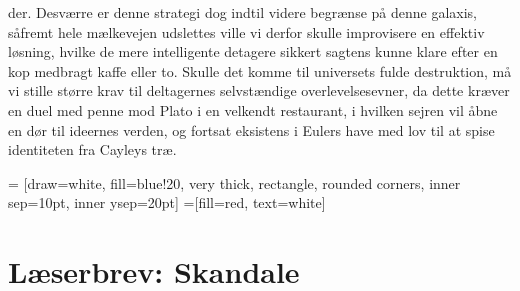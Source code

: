 \begin{minipage}[b]{0.95\linewidth}
\begin{minipage}[t]{0.47\textwidth}
der. Desværre er denne strategi dog indtil videre begrænse på denne galaxis, såfremt hele mælkevejen udslettes ville vi derfor skulle improvisere en effektiv løsning, hvilke de mere intelligente detagere sikkert sagtens kunne klare efter en kop medbragt kaffe eller to. Skulle det komme til universets fulde destruktion, må vi stille større krav til deltagernes selvstændige overlevelsesevner, da dette kræver en duel med penne mod Plato i en velkendt restaurant, i hvilken sejren vil åbne en dør til ideernes verden, og fortsat eksistens i Eulers have med lov til at spise identiteten fra Cayleys træ.


\end{minipage}
\hfill\begin{minipage}[t]{0.47\textwidth}

\vspace{1mm}
 = [draw=white, fill=blue!20, very thick,
    rectangle, rounded corners, inner sep=10pt, inner ysep=20pt]
 =[fill=red, text=white]

%
\vspace{-2mm}

\section*{Læserbrev: Skandale}


\end{minipage}
\end{minipage}
